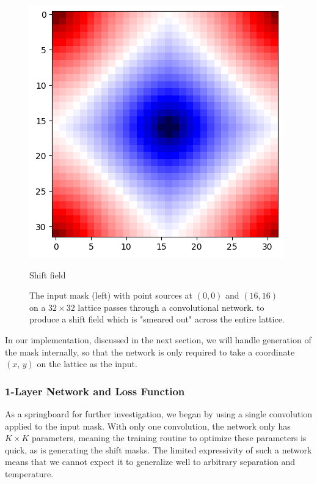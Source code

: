 \documentclass[12pt]{article}
\begin{document}
\begin{figure}[h]
\begin{minipage}{0.3\textwidth}
		\includegraphics[width=\textwidth]{figures/smeared.png}
		\caption*{Shift field}
	\end{minipage}
	\caption[Input Mask and Output]{The input mask (left) with point sources at $(0,0)$ and $(16,16)$ on a $32\times 32$ lattice passes through a convolutional network. 
	to produce a shift field which is "smeared out" across the entire lattice.}
	\label{fig:mask_to_shift}
\end{figure}

In our implementation, discussed in the next section, we will handle generation of the mask internally, so that the network is only required to
take a coordinate $(x,\,y)$ on the lattice as the input. 

\subsubsection{1-Layer Network and Loss Function}

As a springboard for further investigation, we began by using a single convolution applied to the input mask. With only one convolution, the network
only has $K\times K$ parameters, meaning the training routine to optimize these parameters is quick, as is generating the shift masks. The limited
expressivity of such a network means that we cannot expect it to generalize well to arbitrary separation and temperature.
\end{document}
